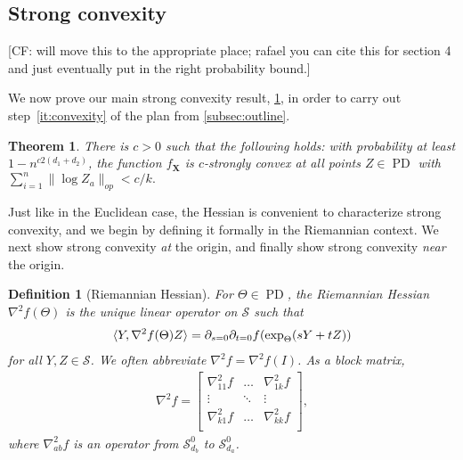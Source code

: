 \documentclass{article}
\newtheorem{theorem}{Theorem}
\newtheorem{definition}{Definition}
\renewcommand{\vec}{\bm}
\newcommand\PD{\operatorname{PD}}
\newcommand\Sym{\mathcal{S}}
\newcommand{\CF}[1]{{\color{purple}[CF: #1]}}
\begin{document}





\subsection{Strong convexity}
\CF{will move this to the appropriate place; rafael you can cite this for section 4 and just eventually put in the right probability bound.}




We now prove our main strong convexity result, \cref{thm:ball-convexity}, in order to carry out step~\ref{it:convexity} of the plan from \cref{subsec:outline}.

\begin{theorem}\label{thm:ball-convexity}
There is $c> 0$ such that the following holds: with probability at least $1 - n^{c 2 (d_1 + d_2)}$, the function $f_{\vec X}$ is $c$-strongly convex at all points $Z\in \PD$ with $\sum_{i = 1}^n \|\log Z_a\|_{op} < c/k.$ 
\end{theorem}

Just like in the Euclidean case, the Hessian is convenient to characterize strong convexity, and we begin by defining it formally in the Riemannian context.
We next show strong convexity \emph{at} the origin, and finally show strong convexity \emph{near} the origin.

\begin{definition}[Riemannian Hessian]
For $\Theta \in \PD$, the \emph{Riemannian Hessian}~$\nabla^2 f(\Theta)$ is the unique linear operator on $\Sym$ such that
\begin{align*}
  \braket{Y, \nabla^2 f(\Theta) Z} = \partial_{s=0} \partial_{t=0} f(\exp_{\Theta}(sY + tZ))
\end{align*}
for all $Y, Z\in \Sym$.
We often abbreviate $\nabla^2 f = \nabla^2 f(I)$.
As a block matrix,
\begin{align*}
  \nabla^2 f = \begin{bmatrix}
  \nabla_{11}^2 f & \dots & \nabla_{1k}^2 f \\
  \vdots & \ddots & \vdots \\
  \nabla_{k1}^2 f & \dots & \nabla_{kk}^2 f \\
  \end{bmatrix},
\end{align*}
where $\nabla_{ab}^2f$ is an operator from $\Sym_{d_b}^0$ to $\Sym_{d_a}^0$.
\end{definition}
\end{document}
